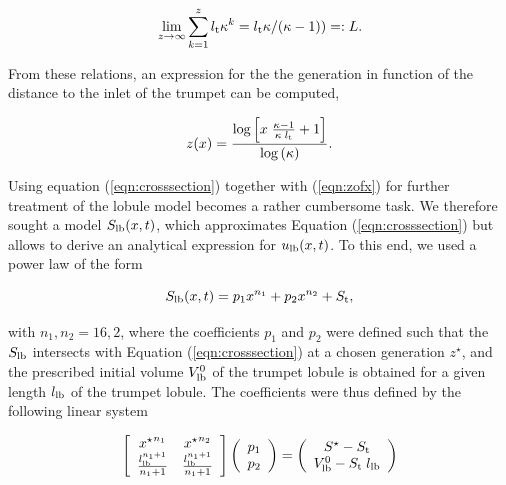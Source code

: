\begin{equation}
\lim_{z \to \infty}\sum_{k=1}^z l_{\mathrm{t}}\kappa^k = l_{\mathrm{t}}\kappa/(\kappa - 1)) =: L \text{.}
\end{equation}

From these relations, an expression for the the generation in function of the distance to the inlet of the trumpet can be computed,

\begin{equation}\label{eqn:zofx}
z(x) = \frac{\log{\left[x\;\frac{\kappa - 1}{\kappa\;l_{\mathrm{t}}} + 1\right]}}{\log{(\kappa)}}\text{.}
\end{equation}

Using equation (\ref{eqn:crosssection}) together with (\ref{eqn:zofx}) for further treatment of the lobule model becomes a rather cumbersome task.
We therefore sought a model $S_{\mathrm{lb}}(x,t)$, which approximates Equation (\ref{eqn:crosssection}) but allows to derive an analytical expression for $u_{\mathrm{lb}}(x,t)$.
To this end, we used a power law of the form

\begin{equation}\label{eqn:crosssectionModel}
S_{\mathrm{lb}}(x,t) = p_1 x^{n_1} + p_2 x^{n_2} + S_{\mathrm{t}}\text{,}
\end{equation}

with $n_1, n_2 = 16, 2$, where the coefficients $p_1$ and $p_2$ were defined such that the $S_{\mathrm{lb}}$ intersects with Equation (\ref{eqn:crosssection}) at a chosen generation $z^\star$, and the prescribed initial volume $V_{\mathrm{lb}}^0$ of the trumpet lobule is obtained for a given length $l_{\mathrm{lb}}$ of the trumpet lobule.
The coefficients were thus defined by the following linear system

\begin{equation} \label{eqn:linearSystemCoeff}
\left[\begin{array}{c c} {x^\star}^{n_1}              & {x^\star}^{n_2} \\
                         \frac{l_{\mathrm{lb}}^{n_1+1}}{n_1 + 1} & \frac{l_{\mathrm{lb}}^{n_1+1}}{n_1 + 1} \\
      \end{array}\right]
\left(\begin{array}{c} p_1 \\
                       p_2 \\
      \end{array}\right)
=
\left(\begin{array}{c} S^\star - S_{\mathrm{t}} \\
                       V_\mathrm{lb}^0 - S_{\mathrm{t}}\;l_{\mathrm{lb}}\\
      \end{array}\right)
\end{equation}

